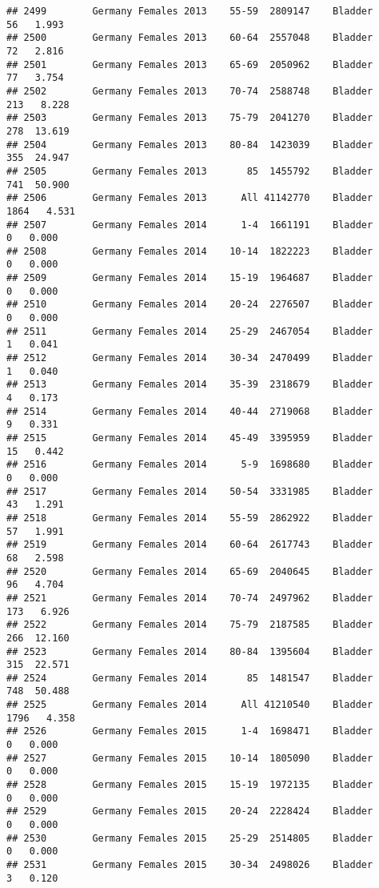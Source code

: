 \documentclass[
]{article}
\begin{document}
\begin{verbatim}
## 2499        Germany Females 2013    55-59  2809147    Bladder     56   1.993
## 2500        Germany Females 2013    60-64  2557048    Bladder     72   2.816
## 2501        Germany Females 2013    65-69  2050962    Bladder     77   3.754
## 2502        Germany Females 2013    70-74  2588748    Bladder    213   8.228
## 2503        Germany Females 2013    75-79  2041270    Bladder    278  13.619
## 2504        Germany Females 2013    80-84  1423039    Bladder    355  24.947
## 2505        Germany Females 2013       85  1455792    Bladder    741  50.900
## 2506        Germany Females 2013      All 41142770    Bladder   1864   4.531
## 2507        Germany Females 2014      1-4  1661191    Bladder      0   0.000
## 2508        Germany Females 2014    10-14  1822223    Bladder      0   0.000
## 2509        Germany Females 2014    15-19  1964687    Bladder      0   0.000
## 2510        Germany Females 2014    20-24  2276507    Bladder      0   0.000
## 2511        Germany Females 2014    25-29  2467054    Bladder      1   0.041
## 2512        Germany Females 2014    30-34  2470499    Bladder      1   0.040
## 2513        Germany Females 2014    35-39  2318679    Bladder      4   0.173
## 2514        Germany Females 2014    40-44  2719068    Bladder      9   0.331
## 2515        Germany Females 2014    45-49  3395959    Bladder     15   0.442
## 2516        Germany Females 2014      5-9  1698680    Bladder      0   0.000
## 2517        Germany Females 2014    50-54  3331985    Bladder     43   1.291
## 2518        Germany Females 2014    55-59  2862922    Bladder     57   1.991
## 2519        Germany Females 2014    60-64  2617743    Bladder     68   2.598
## 2520        Germany Females 2014    65-69  2040645    Bladder     96   4.704
## 2521        Germany Females 2014    70-74  2497962    Bladder    173   6.926
## 2522        Germany Females 2014    75-79  2187585    Bladder    266  12.160
## 2523        Germany Females 2014    80-84  1395604    Bladder    315  22.571
## 2524        Germany Females 2014       85  1481547    Bladder    748  50.488
## 2525        Germany Females 2014      All 41210540    Bladder   1796   4.358
## 2526        Germany Females 2015      1-4  1698471    Bladder      0   0.000
## 2527        Germany Females 2015    10-14  1805090    Bladder      0   0.000
## 2528        Germany Females 2015    15-19  1972135    Bladder      0   0.000
## 2529        Germany Females 2015    20-24  2228424    Bladder      0   0.000
## 2530        Germany Females 2015    25-29  2514805    Bladder      0   0.000
## 2531        Germany Females 2015    30-34  2498026    Bladder      3   0.120

\end{verbatim}
\end{document}
